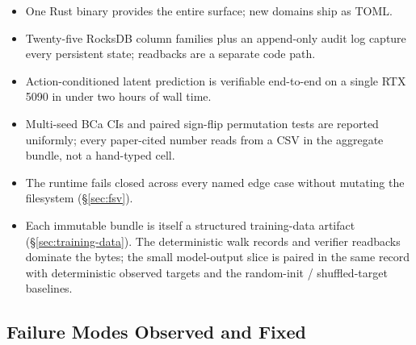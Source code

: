 \documentclass[10pt,twocolumn,letterpaper]{article}
\begin{document}
\begin{itemize}
\item One Rust binary provides the entire surface; new domains
      ship as TOML.
\item Twenty-five RocksDB column families plus an append-only
      audit log capture every persistent state; readbacks are a
      separate code path.
\item Action-conditioned latent prediction is verifiable
      end-to-end on a single RTX 5090 in under two hours of wall
      time.
\item Multi-seed BCa CIs and paired sign-flip permutation tests
      are reported uniformly; every paper-cited number reads from
      a CSV in the aggregate bundle, not a hand-typed cell.
\item The runtime fails closed across every named edge case
      without mutating the filesystem (\S\ref{sec:fsv}).
\item Each immutable bundle is itself a structured training-data
      artifact (\S\ref{sec:training-data}). The deterministic
      walk records and verifier readbacks dominate the bytes;
      the small model-output slice is paired in the same record
      with deterministic observed targets and the random-init /
      shuffled-target baselines.
\end{itemize}

\subsection{Failure Modes Observed and Fixed}
\end{document}
